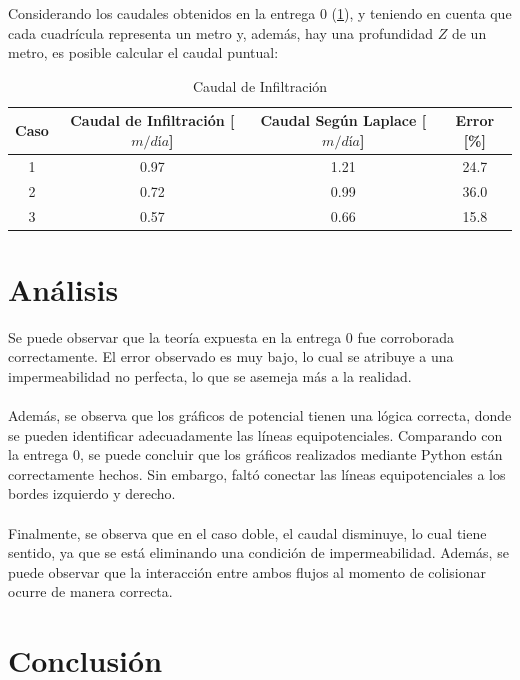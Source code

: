 Considerando los caudales obtenidos en la entrega 0 (\ref{fig:Q_inf}), y teniendo en cuenta que cada cuadrícula representa un metro y, además, hay una profundidad \(Z\) de un metro, es posible calcular el caudal puntual:

\begin{table}[H]
    \centering
    \begin{tabular}{|c|c|c|c|}
      \hline
      \textbf{Caso} & \textbf{Caudal de Infiltración [$m/día$]} & \textbf{Caudal Según Laplace [$m/día$]} & \textbf{Error [\%]} \\ \hline
      1 & 0.97 & 1.21  &  24.7  \\ \hline
      2 & 0.72 &  0.99 &  36.0 \\ \hline
      3 & 0.57 &  0.66 &  15.8  \\
      \hline
    \end{tabular}
    \caption{Caudal de Infiltración}
    \label{fig:Q_inf}
\end{table}

\section{Análisis}

Se puede observar que la teoría expuesta en la entrega 0 fue corroborada correctamente. El error observado es muy bajo, lo cual se atribuye a una impermeabilidad no perfecta, lo que se asemeja más a la realidad.
\\ \\
Además, se observa que los gráficos de potencial tienen una lógica correcta, donde se pueden identificar adecuadamente las líneas equipotenciales. Comparando con la entrega 0, se puede concluir que los gráficos realizados mediante Python están correctamente hechos. Sin embargo, faltó conectar las líneas equipotenciales a los bordes izquierdo y derecho.
\\ \\
Finalmente, se observa que en el caso doble, el caudal disminuye, lo cual tiene sentido, ya que se está eliminando una condición de impermeabilidad. Además, se puede observar que la interacción entre ambos flujos al momento de colisionar ocurre de manera correcta.

\section{Conclusión}

